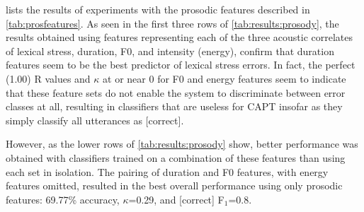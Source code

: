 \documentclass[a4paper]{article}
\begin{document}
		 lists the results of experiments with the prosodic features described in \cref{tab:prosfeatures}. As seen in the first three rows of \cref{tab:results:prosody}, the results obtained using features representing each of the three acoustic correlates of lexical stress, duration, F0, and intensity (energy), confirm that duration features seem to be the best predictor of lexical stress errors.%
		In fact, the perfect (1.00) R values and $\kappa$ at or near 0 for F0 and energy features seem to indicate that these feature sets do not enable the system to discriminate between error classes at all, resulting in classifiers that are useless for CAPT insofar as they simply classify all utterances as [correct].
		
		However, as the lower rows of \cref{tab:results:prosody} show, better performance was obtained with classifiers trained on a combination of these features than using each set in isolation. The pairing of duration and F0 features, with energy features omitted, resulted in the best overall performance using only prosodic features: 
		69.77\% accuracy, $\kappa$=0.29, and [correct] F$_1$=0.8.
		
\end{document}
